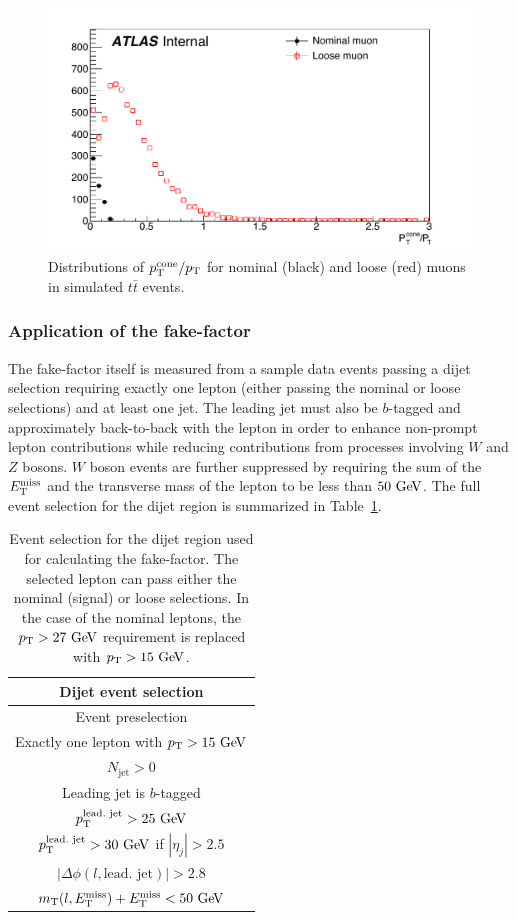 \begin{figure}[htbp]
  \centering
  \includegraphics[width=.6\textwidth]{figs/ssww_13tev/backgrounds/ff/ptcone_muon_ttbar}
  \caption{Distributions of $p_{\mathrm{T}}^{\textrm{cone}}/p_{\mathrm{T}}$ for nominal (black) and loose (red) muons in simulated $t\bar{t}$ events.}
  \label{fig:ssww13tev_ff_ptcone_muons}
\end{figure}

%
\subsubsection{Application of the fake-factor}\label{ssww13tev:ff_implementation}
The fake-factor itself is measured from a sample data events passing a dijet selection requiring exactly one lepton (either passing the nominal or loose selections) and at least one jet.
The leading jet must also be $b$-tagged and approximately back-to-back with the lepton in order to enhance non-prompt lepton contributions while reducing contributions from processes involving $W$ and $Z$ bosons.
$W$ boson events are further suppressed by requiring the sum of the $E_{\mathrm{T}}^{\mathrm{miss}}$ and the transverse mass of the lepton to be less than $50\gev$.
The full event selection for the dijet region is summarized in Table~\ref{tab:ssww13tev_dijet_cr}.

\begin{table}[hbtp]
  \centering
  \begin{tabular}{c}
    Dijet event selection \\
    \hline\hline
    Event preselection\\
    Exactly one lepton with $\pt > 15\gev$\\
    $N_{\textrm{jet}} > 0$ \\
    Leading jet is $b$-tagged \\
    $\pt^{\textrm{lead.\ jet}} > 25\gev$\\
    $\pt^{\textrm{lead.\ jet}} > 30\gev$ if $|\eta_j| > 2.5$ \\
    $|\Delta\phi(l,\textrm{lead.\ jet})| > 2.8$ \\
    $m_{\textrm{T}}(l,\met) + \met < 50\gev$ \\
    \hline
  \end{tabular}
  \caption{Event selection for the dijet region used for calculating the fake-factor. The selected lepton can pass either the nominal (signal) or loose selections.  In the case of the nominal leptons, the $\pt > 27\gev$ requirement is replaced with $\pt > 15\gev$.}
  \label{tab:ssww13tev_dijet_cr}
\end{table}

